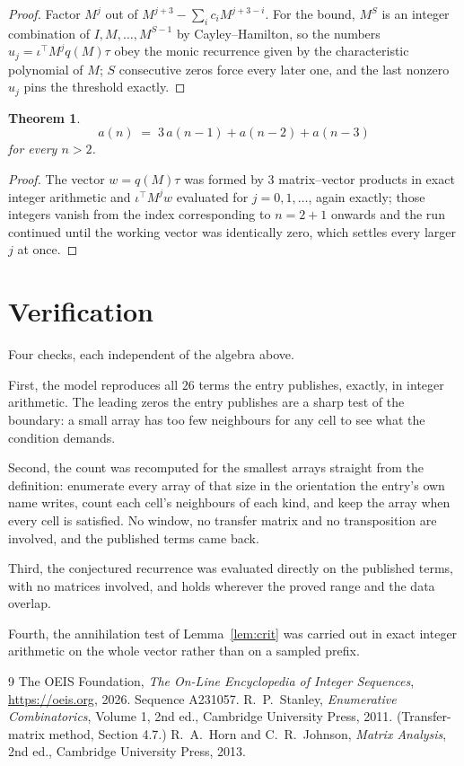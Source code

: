 \documentclass[11pt,a4paper]{article}
\theoremstyle{plain}
\newtheorem{theorem}{Theorem}
\theoremstyle{definition}
\begin{document}
\begin{proof}
Factor $M^{j}$ out of $M^{j+3}-\sum_ic_iM^{j+3-i}$. For the bound, $M^{S}$
is an integer combination of $I,M,\dots,M^{S-1}$ by Cayley--Hamilton, so the numbers
$u_j=\iota^{\!\top}M^{j}q(M)\tau$ obey the monic recurrence given by the characteristic
polynomial of $M$; $S$ consecutive zeros force every later one, and the last nonzero $u_j$
pins the threshold exactly.
\end{proof}

\begin{theorem}
\[
a(n)\;=\;3\,a(n-1) + a(n-2) + a(n-3)
\]
for every $n>2$.
\end{theorem}

\begin{proof}
The vector $w=q(M)\tau$ was formed by $3$ matrix--vector products in exact integer
arithmetic and $\iota^{\!\top}M^{j}w$ evaluated for $j=0,1,\dots$, again exactly; those
integers vanish from the index corresponding to $n=2+1$ onwards and the run continued
until the working vector was identically zero, which settles every larger $j$ at once.
\end{proof}

\section{Verification}

Four checks, each independent of the algebra above.

First, the model reproduces all $26$ terms the entry publishes, exactly, in integer
arithmetic. The leading zeros the entry publishes are a sharp test of the boundary: a small
array has too few neighbours for any cell to see what the condition demands.

Second, the count was recomputed for the smallest arrays straight from the definition:
enumerate every array of that size in the orientation the entry's own name writes, count each
cell's neighbours of each kind, and keep the array when every cell is satisfied. No window, no
transfer matrix and no transposition are involved, and the published terms came back.

Third, the conjectured recurrence was evaluated directly on the published terms, with no
matrices involved, and holds wherever the proved range and the data overlap.

Fourth, the annihilation test of Lemma~\ref{lem:crit} was carried out in exact integer
arithmetic on the whole vector rather than on a sampled prefix.

\begin{thebibliography}{9}
 The OEIS Foundation, \emph{The On-Line Encyclopedia of Integer
Sequences}, \url{https://oeis.org}, 2026. Sequence A231057.
 R.~P.~Stanley, \emph{Enumerative Combinatorics}, Volume 1, 2nd ed.,
Cambridge University Press, 2011. (Transfer-matrix method, Section 4.7.)
 R.~A.~Horn and C.~R.~Johnson, \emph{Matrix Analysis}, 2nd ed., Cambridge
University Press, 2013.
\end{thebibliography}
\end{document}
